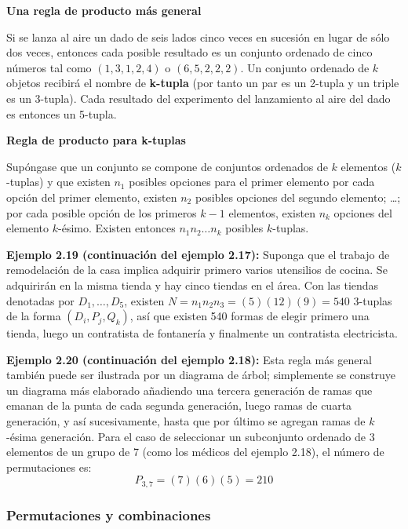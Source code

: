 \documentclass[a4paper]{article}
\begin{document}
\textbf{Una regla de producto más general}

Si se lanza al aire un dado de seis lados cinco veces en sucesión en lugar de sólo dos veces, entonces cada posible resultado es un conjunto ordenado de cinco números tal como $(1, 3, 1, 2, 4)$ o $(6, 5, 2, 2, 2)$. Un conjunto ordenado de $k$ objetos recibirá el nombre de \textbf{k-tupla} (por tanto un par es un 2-tupla y un triple es un 3-tupla). Cada resultado del experimento del lanzamiento al aire del dado es entonces un 5-tupla.

\textbf{Regla de producto para k-tuplas}

Supóngase que un conjunto se compone de conjuntos ordenados de $k$ elementos ($k$-tuplas) y que existen $n_1$ posibles opciones para el primer elemento por cada opción del primer elemento, existen $n_2$ posibles opciones del segundo elemento; \dots; por cada posible opción de los primeros $k - 1$ elementos, existen $n_k$ opciones del elemento $k$-ésimo. Existen entonces $n_1 n_2 \dots n_k$ posibles $k$-tuplas.


\textbf{Ejemplo 2.19 (continuación del ejemplo 2.17):}
Suponga que el trabajo de remodelación de la casa implica adquirir primero varios utensilios de cocina. Se adquirirán en la misma tienda y hay cinco tiendas en el área. Con las tiendas denotadas por $D_1, \dots, D_5$, existen $N = n_1 n_2 n_3 = (5)(12)(9) = 540$ 3-tuplas de la forma $(D_i, P_j, Q_k)$, así que existen 540 formas de elegir primero una tienda, luego un contratista de fontanería y finalmente un contratista electricista.

\textbf{Ejemplo 2.20 (continuación del ejemplo 2.18):}
Esta regla más general también puede ser ilustrada por un diagrama de árbol; simplemente se construye un diagrama más elaborado añadiendo una tercera generación de ramas que emanan de la punta de cada segunda generación, luego ramas de cuarta generación, y así sucesivamente, hasta que por último se agregan ramas de $k$-ésima generación. Para el caso de seleccionar un subconjunto ordenado de 3 elementos de un grupo de 7 (como los médicos del ejemplo 2.18), el número de permutaciones es:
$$ P_{3,7} = (7)(6)(5) = 210 $$

\subsubsection{Permutaciones y combinaciones}
\end{document}
